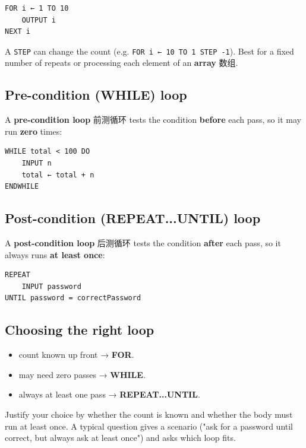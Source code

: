 \documentclass[11pt]{article}
\begin{document}
\begin{Verbatim}
FOR i ← 1 TO 10
    OUTPUT i
NEXT i
\end{Verbatim}

A \texttt{STEP} can change the count (e.g. \texttt{FOR i ← 10 TO 1 STEP -1}). Best for a fixed number of repeats or processing each element of an \textbf{array} 数组.

\subsection*{Pre-condition (WHILE) loop}

A \textbf{pre-condition loop} 前测循环 tests the condition \textbf{before} each pass, so it may run \textbf{zero} times:

\begin{Verbatim}
WHILE total < 100 DO
    INPUT n
    total ← total + n
ENDWHILE
\end{Verbatim}

\subsection*{Post-condition (REPEAT...UNTIL) loop}

A \textbf{post-condition loop} 后测循环 tests the condition \textbf{after} each pass, so it always runs \textbf{at least once}:

\begin{Verbatim}
REPEAT
    INPUT password
UNTIL password = correctPassword
\end{Verbatim}

\subsection*{Choosing the right loop}

\begin{itemize}
\item count known up front → \textbf{FOR}.

\item may need zero passes → \textbf{WHILE}.

\item always at least one pass → \textbf{REPEAT...UNTIL}.

\end{itemize}

Justify your choice by whether the count is known and whether the body must run at least once. A typical question gives a scenario ("ask for a password until correct, but always ask at least once") and asks which loop fits.
\end{document}
